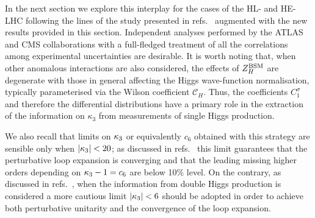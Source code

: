 In the next section we explore this interplay for the cases of the HL- and HE-LHC following the lines of the study presented in refs.~\cite{DiVita:2017eyz} augmented with the new results provided in this section. Independent analyses performed by the ATLAS and CMS collaborations with a full-fledged treatment of all the correlations among experimental uncertainties are desirable. It is worth noting that, when other anomalous interactions are also considered, the effects of  $Z_H^{\rm BSM}$ are degenerate with those in general affecting the Higgs wave-function normalisation, typically parameterised via the Wilson coefficient $\mathcal{C}_{H}$. Thus, the coefficients $C_1^{\sigma}$ and therefore the differential distributions have a primary role in the extraction of the information on $\kappa_3$ from measurements of  single Higgs production.

We also recall that limits on $\kappa_{3}$ or equivalently $c_6$ obtained with this strategy are sensible only when $|\kappa_{3}|<20$; as discussed in refs.~\cite{Degrassi:2016wml} this limit guarantees that the perturbative loop expansion is converging and that the leading missing higher orders depending on $\kappa_{3}-1=c_6$ are below 10\% level. On the contrary, as discussed in refs.~\cite{DiLuzio:2017tfn, Maltoni:2018ttu}, when the information from double Higgs production is considered a more cautious limit $|\kappa_{3}|<6$ should be adopted in order to achieve both perturbative unitarity and the convergence of the loop expansion.
 









%
%